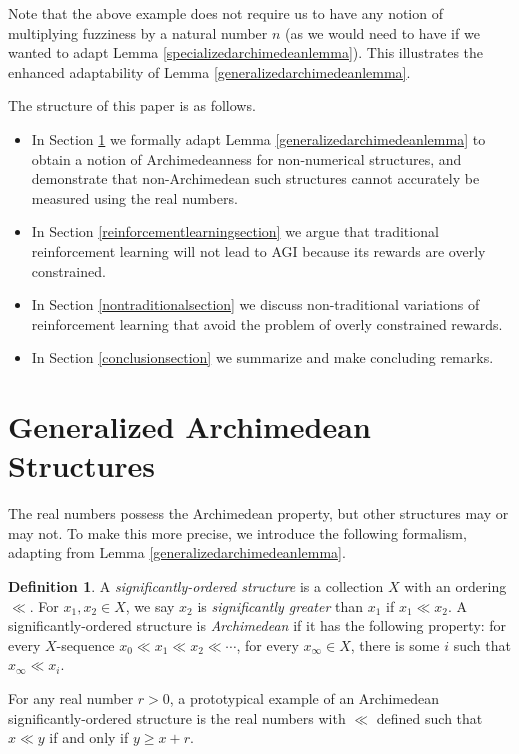 \documentclass[reqno]{article}
\theoremstyle{definition}
\newtheorem{definition}{Definition}
\begin{document}
Note that the above example does not require us to have any notion
of multiplying fuzziness by a natural number $n$ (as we would need to have
if we wanted to adapt Lemma \ref{specializedarchimedeanlemma}).
This illustrates the enhanced adaptability of Lemma \ref{generalizedarchimedeanlemma}.

The structure of this paper is as follows.
\begin{itemize}
    \item
    In Section \ref{backgroundsection} we formally adapt
    Lemma \ref{generalizedarchimedeanlemma} to obtain a notion of Archimedeanness
    for non-numerical structures, and demonstrate that non-Archimedean such
    structures cannot accurately be measured using the real numbers.
    \item
    In Section \ref{reinforcementlearningsection} we argue that
    traditional reinforcement learning will not lead to AGI because
    its rewards are overly constrained.
    \item
    In Section \ref{nontraditionalsection} we discuss non-traditional
    variations of reinforcement learning that avoid the problem of
    overly constrained rewards.
    \item
    In Section \ref{conclusionsection} we summarize and make concluding remarks.
\end{itemize}


\section{Generalized Archimedean Structures}
\label{backgroundsection}

The real numbers possess the Archimedean property, but other structures
may or may not. To make this more precise,
we introduce the following formalism, adapting from Lemma \ref{generalizedarchimedeanlemma}.

\begin{definition}
    A \emph{significantly-ordered structure} is a collection $X$ with
    an ordering $\ll$.
    For $x_1,x_2\in X$, we say $x_2$ is \emph{significantly greater}
    than $x_1$ if $x_1\ll x_2$.
    A significantly-ordered structure is \emph{Archimedean} if it
    has the following property: for every $X$-sequence
    $x_0\ll x_1\ll x_2 \ll \cdots$,
    for every $x_\infty\in X$, there is some $i$ such that $x_\infty\ll x_i$.
\end{definition}

For any real number $r>0$, a prototypical example of an Archimedean
significantly-ordered structure is the real
numbers with $\ll$ defined such that
$x\ll y$ if and only if $y\geq x+r$.
\end{document}
